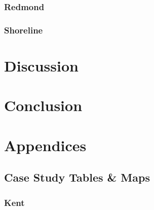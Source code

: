 \documentclass[
]{agujournal2019}
\begin{document}
\subsubsection{Redmond}\label{redmond}

\subsubsection{Shoreline}\label{shoreline}

\section{Discussion}\label{discussion}

\section{Conclusion}\label{conclusion}

\section*{Appendices}\label{appendices}

\subsection{Case Study Tables \& Maps}\label{case-study-tables-maps}

\subsubsection{Kent}\label{kent-1}

\captionsetup{labelsep=none}
\end{document}
